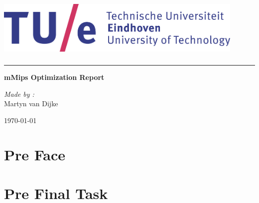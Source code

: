 \documentclass[10pt]{article}
\begin{document}
\begin{titlepage}
    \color[rgb]{.1,.1,1}
    \hspace{5mm}
    \includegraphics[width=12cm,height=3cm]{tue.png}

    \bigskip

    \hspace{40mm}
    \begin{minipage}{10mm}
        \color[rgb]{.0,.0,0.0}
        \rule{1pt}{200mm}
    \end{minipage}
    \begin{minipage}{133mm}
        \vspace{20mm}
        \color{black}
        \Huge{\bfseries {mMips Optimization Report}}

        \vspace{40mm}

        \textit{Made by :}\\
        Martyn van Dijke


        \vspace{20mm}

        \today
        \hspace{30mm} %
        \color[rgb]{.4,.4,1} %
    \end{minipage}
\end{titlepage}

\restoregeometry
\clearpage
\section{Pre Face}

\clearpage

\tableofcontents

\clearpage

\section{Pre Final Task}

\pagestyle{fancy}
\lhead{ \nouppercase \leftmark }
\chead{  }
\rhead{    }
\renewcommand{\headrulewidth}{0.4pt}
\lfoot{}
\cfoot{}
\end{document}
